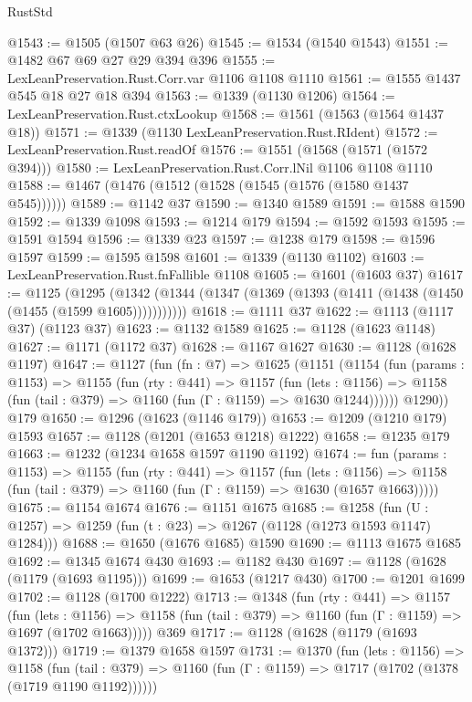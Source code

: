 \begin{lexlean}{RustStd}
\begin{coremodule}
@1543 := @1505 (@1507 @63 @26)
@1545 := @1534 (@1540 @1543)
@1551 := @1482 @67 @69 @27 @29 @394 @396
@1555 := LexLeanPreservation.Rust.Corr.var @1106 @1108 @1110
@1561 := @1555 @1437 @545 @18 @27 @18 @394
@1563 := @1339 (@1130 @1206)
@1564 := LexLeanPreservation.Rust.ctxLookup
@1568 := @1561 (@1563 (@1564 @1437 @18))
@1571 := @1339 (@1130 LexLeanPreservation.Rust.RIdent)
@1572 := LexLeanPreservation.Rust.readOf
@1576 := @1551 (@1568 (@1571 (@1572 @394)))
@1580 := LexLeanPreservation.Rust.Corr.lNil @1106 @1108 @1110
@1588 := @1467 (@1476 (@1512 (@1528 (@1545 (@1576 (@1580 @1437 @545))))))
@1589 := @1142 @37
@1590 := @1340 @1589
@1591 := @1588 @1590
@1592 := @1339 @1098
@1593 := @1214 @179
@1594 := @1592 @1593
@1595 := @1591 @1594
@1596 := @1339 @23
@1597 := @1238 @179
@1598 := @1596 @1597
@1599 := @1595 @1598
@1601 := @1339 (@1130 @1102)
@1603 := LexLeanPreservation.Rust.fnFallible @1108
@1605 := @1601 (@1603 @37)
@1617 := @1125
    (@1295 (@1342 (@1344 (@1347 (@1369 (@1393 (@1411 (@1438 (@1450 (@1455 (@1599 @1605)))))))))))
@1618 := @1111 @37
@1622 := @1113 (@1117 @37) (@1123 @37)
@1623 := @1132 @1589
@1625 := @1128 (@1623 @1148)
@1627 := @1171 (@1172 @37)
@1628 := @1167 @1627
@1630 := @1128 (@1628 @1197)
@1647 := @1127
    (fun (fn : @7) =>
    @1625
      (@1151
        (@1154
          (fun (params : @1153) =>
          @1155
            (fun (rty : @441) =>
            @1157
              (fun (lets : @1156) =>
              @1158 (fun (tail : @379) => @1160 (fun (Γ : @1159) => @1630 @1244))))))
        @1290))
    @179
@1650 := @1296 (@1623 (@1146 @179))
@1653 := @1209 (@1210 @179) @1593
@1657 := @1128 (@1201 (@1653 @1218) @1222)
@1658 := @1235 @179
@1663 := @1232 (@1234 @1658 @1597 @1190 @1192)
@1674 := fun (params : @1153) =>
  @1155
    (fun (rty : @441) =>
    @1157
      (fun (lets : @1156) =>
      @1158 (fun (tail : @379) => @1160 (fun (Γ : @1159) => @1630 (@1657 @1663)))))
@1675 := @1154 @1674
@1676 := @1151 @1675
@1685 := @1258 (fun (U : @1257) => @1259 (fun (t : @23) => @1267 (@1128 (@1273 @1593 @1147) @1284)))
@1688 := @1650 (@1676 @1685) @1590
@1690 := @1113 @1675 @1685
@1692 := @1345 @1674 @430
@1693 := @1182 @430
@1697 := @1128 (@1628 (@1179 (@1693 @1195)))
@1699 := @1653 (@1217 @430)
@1700 := @1201 @1699
@1702 := @1128 (@1700 @1222)
@1713 := @1348
    (fun (rty : @441) =>
    @1157
      (fun (lets : @1156) =>
      @1158 (fun (tail : @379) => @1160 (fun (Γ : @1159) => @1697 (@1702 @1663)))))
    @369
@1717 := @1128 (@1628 (@1179 (@1693 @1372)))
@1719 := @1379 @1658 @1597
@1731 := @1370
    (fun (lets : @1156) =>
    @1158
      (fun (tail : @379) => @1160 (fun (Γ : @1159) => @1717 (@1702 (@1378 (@1719 @1190 @1192))))))

\end{coremodule}
\end{lexlean}
